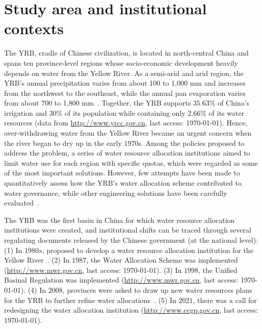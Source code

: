 \documentclass[preprint, 12pt]{elsarticle}
\begin{document}
\section{Study area and institutional contexts}\label{sec:yrb}

The YRB, cradle of Chinese civilization, is located in north-central China and spans ten province-level regions whose socio-economic development heavily depends on water from the Yellow River.
As a semi-arid and arid region, the YRB's annual precipitation varies from about 100 to 1,000 mm and increases from the northwest to the southeast, while the annual pan evaporation varies from about 700 to 1,800 mm~\cite{wang2022e}.
Together, the YRB supports $35.63\%$ of China's irrigation and $30\%$ of its population while containing only $2.66\%$ of its water resources (data from \href{http://www.yrcc.gov.cn}{http://www.yrcc.gov.cn}, last access: \today).
Hence, over-withdrawing water from the Yellow River became an urgent concern when the river began to dry up in the early 1970s.
Among the policies proposed to address the problem, a series of water resource allocation institutions aimed to limit water use for each region with specific quotas, which were regarded as some of the most important solutions.
However, few attempts have been made to quantitatively assess how the YRB's water allocation scheme contributed to water governance, while other engineering solutions have been carefully evaluated~\cite{long2020}.




The YRB was the first basin in China for which water resource allocation institutions were created, and institutional shifts can be traced through several regulating documents released by the Chinese government (at the national level):
(1) In $1980s$, proposed to develop a water resource allocation institution for the Yellow River~\cite{wang2019d, wang2019e}.
(2) In $1987$, the Water Allocation Scheme was implemented (\href{http://www.gov.cn/zhengce/content/2011-03/30/content_3138.htm#}{http://www.mwr.gov.cn}, last access: \today).
(3) In $1998$, the Unified Basinal Regulation was implemented (\href{http://www.mwr.gov.cn/ztpd/2013ztbd/2013fxkh/fxkhswcbcs/cs/flfg/201304/t20130411_433489.html}{http://www.mwr.gov.cn}, last access: \today).
(4) In $2008$, provinces were asked to draw up new water resources plans for the YRB to further refine water allocations~\cite{wang2019d,wang2019e}.
(5) In $2021$, there was a call for redesigning the water allocation institution (\href{http://www.ccgp.gov.cn/cggg/zygg/gkzb/202107/t20210721_16591901.htm}{http://www.ccgp.gov.cn}, last access: \today).
\end{document}
